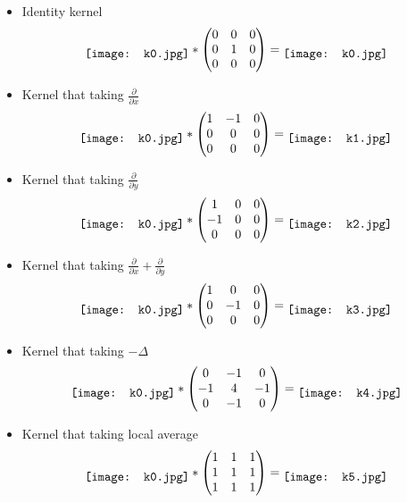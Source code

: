 \begin{itemize}
\item Identity kernel
$$
\raisebox{-.5\height}{\texttt{[image: k0.jpg]}} *
\begin{pmatrix}
    0 & 0 & 0\\
    0 & 1 & 0\\
    0 & 0 & 0
\end{pmatrix} = 
\raisebox{-.5\height}{\texttt{[image: k0.jpg]}} 
$$
\item Kernel that taking $\frac{\partial}{\partial x}$
$$
\raisebox{-.5\height}{\texttt{[image: k0.jpg]}} *
\begin{pmatrix}
    1 & -1 & 0\\
    0 & 0 & 0\\
    0 & 0 & 0
\end{pmatrix} = 
\raisebox{-.5\height}{\texttt{[image: k1.jpg]}} 
$$
\item Kernel that taking $\frac{\partial}{\partial y}$
$$
\raisebox{-.5\height}{\texttt{[image: k0.jpg]}} *
\begin{pmatrix}
    1 & 0 & 0\\
    -1 & 0 & 0\\
    0 & 0 & 0
\end{pmatrix} = 
\raisebox{-.5\height}{\texttt{[image: k2.jpg]}} 
$$
\item Kernel that taking $\frac{\partial}{\partial x}+\frac{\partial}{\partial y}$
$$
\raisebox{-.5\height}{\texttt{[image: k0.jpg]}} *
\begin{pmatrix}
    1 & 0 & 0\\
    0 & -1 & 0\\
    0 & 0 & 0
\end{pmatrix} = 
\raisebox{-.5\height}{\texttt{[image: k3.jpg]}} 
$$
\item Kernel that taking $-\Delta$
$$
\raisebox{-.5\height}{\texttt{[image: k0.jpg]}} *
\begin{pmatrix}
    0 & -1 & 0\\
    -1 & 4 & -1\\
    0 & -1 & 0
\end{pmatrix} = 
\raisebox{-.5\height}{\texttt{[image: k4.jpg]}} 
$$
\item Kernel that taking local average
$$
\raisebox{-.5\height}{\texttt{[image: k0.jpg]}} *
\begin{pmatrix}
    1 & 1 & 1\\
    1 & 1 & 1\\
    1 & 1 & 1
\end{pmatrix} = 
\raisebox{-.5\height}{\texttt{[image: k5.jpg]}} 
$$
\end{itemize}


